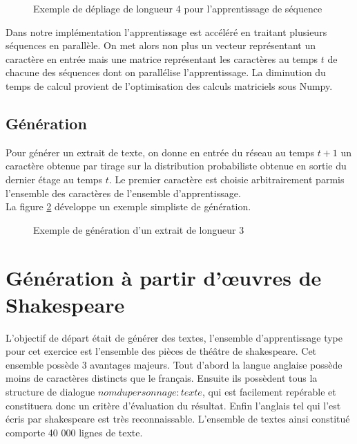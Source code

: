 \begin{figure}[H]
\centering
\resizebox{1\linewidth}{!}{}
\caption{Exemple de dépliage de longueur 4 pour l'apprentissage de séquence}
\label{LSTM_unfold}
\end{figure}

Dans notre implémentation l'apprentissage est accéléré en traitant plusieurs séquences en parallèle. On met alors non plus un vecteur représentant un caractère en entrée mais une matrice représentant les caractères au temps $t$ de chacune des séquences dont on parallélise l'apprentissage. La diminution du temps de calcul provient de l'optimisation des calculs matriciels sous Numpy.

\subsection{Génération}


Pour générer un extrait de texte, on donne en entrée du réseau au temps $t+1$ un caractère obtenue par tirage sur la distribution probabiliste obtenue en sortie du dernier étage au temps $t$.
Le premier caractère est choisie arbitrairement parmis l'ensemble des caractères de l'ensemble d'apprentissage.
\\La figure \ref{LSTM_generate} développe un exemple simpliste de génération.

\begin{figure}[H]
\centering
\resizebox{1\linewidth}{!}{}
\caption{Exemple de génération d'un extrait de longueur 3}
\label{LSTM_generate}
\end{figure}

\section{Génération à partir d'œuvres de Shakespeare}
L'objectif de départ était de générer des textes, l'ensemble d'apprentissage type pour cet exercice est l'ensemble des pièces de théâtre de shakespeare. Cet ensemble possède 3 avantages majeurs. Tout d'abord la langue anglaise possède moins de caractères distincts que le français. Ensuite ils possèdent tous la structure de dialogue $nom du personnage : texte$, qui est facilement repérable et constituera donc un critère d'évaluation du résultat. Enfin l'anglais tel qui l'est écris par shakespeare est très reconnaissable.
L'ensemble de textes ainsi constitué comporte 40 000 lignes de texte.

